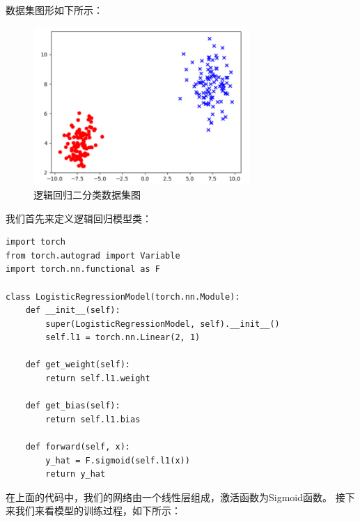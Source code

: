 \documentclass[UTF8]{article}
\begin{document}
数据集图形如下所示：
\begin{figure}[H]
	\caption{逻辑回归二分类数据集图}
	\label{f000027}
	\centering
	\includegraphics[height=6cm]{images/f000027}
\end{figure}
我们首先来定义逻辑回归模型类：
\begin{lstlisting}
import torch
from torch.autograd import Variable
import torch.nn.functional as F

class LogisticRegressionModel(torch.nn.Module):
    def __init__(self):
        super(LogisticRegressionModel, self).__init__()
        self.l1 = torch.nn.Linear(2, 1)

    def get_weight(self):
        return self.l1.weight

    def get_bias(self):
        return self.l1.bias

    def forward(self, x):
        y_hat = F.sigmoid(self.l1(x))
        return y_hat
\end{lstlisting}
在上面的代码中，我们的网络由一个线性层组成，激活函数为Sigmoid函数。\newline
接下来我们来看模型的训练过程，如下所示：
\end{document}
